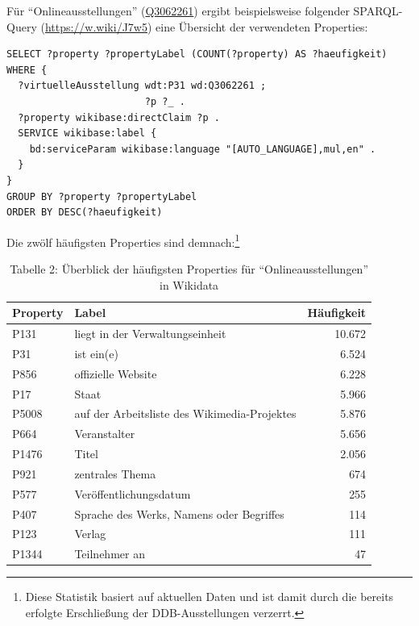 \documentclass[a4paper,
fontsize=11pt,
oneside,
numbers=noperiodatend,
parskip=half-,
bibliography=totoc,
final
]{scrartcl}
\begin{document}
Für \enquote{Onlineausstellungen}
(\href{http://www.wikidata.org/entity/Q3062261}{Q3062261}) ergibt
beispielsweise folgender SPARQL-Query (\url{https://w.wiki/J7w5}) eine
Übersicht der verwendeten Properties:

\begin{lstlisting}
SELECT ?property ?propertyLabel (COUNT(?property) AS ?haeufigkeit)
WHERE {
  ?virtuelleAusstellung wdt:P31 wd:Q3062261 ;
                        ?p ?_ .
  ?property wikibase:directClaim ?p .
  SERVICE wikibase:label {
    bd:serviceParam wikibase:language "[AUTO_LANGUAGE],mul,en" .
  }
}
GROUP BY ?property ?propertyLabel
ORDER BY DESC(?haeufigkeit)
\end{lstlisting}

Die zwölf häufigsten Properties sind demnach:\footnote{Diese Statistik
  basiert auf aktuellen Daten und ist damit durch die bereits erfolgte
  Erschließung der DDB-Ausstellungen verzerrt.}

\begin{table}[H]
\centering
\small
\setlength{\tabcolsep}{8pt}
\renewcommand{\arraystretch}{1.2}
\caption{Tabelle 2: Überblick der häufigsten Properties für
\enquote{Onlineausstellungen} in Wikidata}
\begin{tabular}{@{}l >{\RaggedRight\arraybackslash}p{} r@{}}
\toprule
\textbf{Property} & \textbf{Label} & \textbf{Häufigkeit} \\
\midrule
P131  & liegt in der Verwaltungseinheit             & 10.672 \\
P31   & ist ein(e)                                  &  6.524 \\
P856  & offizielle Website                          &  6.228 \\
P17   & Staat                                       &  5.966 \\
P5008 & auf der Arbeitsliste des Wikimedia-Projektes &  5.876 \\
P664  & Veranstalter                                &  5.656 \\
P1476 & Titel                                       &  2.056 \\
P921  & zentrales Thema                             &    674 \\
P577  & Veröffentlichungsdatum                      &    255 \\
P407  & Sprache des Werks, Namens oder Begriffes    &    114 \\
P123  & Verlag                                      &    111 \\
P1344 & Teilnehmer an                               &     47 \\
\bottomrule
\end{tabular}
\end{table}
\end{document}
